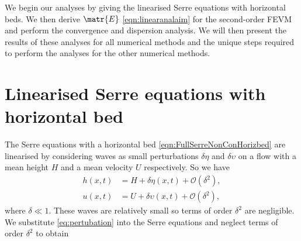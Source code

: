  We begin our analyses by giving the linearised Serre equations with horizontal beds. We then derive $\matr{E}$ \eqref{eqn:linearanalaim} for the second-order FEVM and perform the convergence and dispersion analysis. We will then present the results of these analyses for all numerical methods and the unique steps required to perform the analyses for the other numerical methods.
 

 
\section{Linearised Serre equations with horizontal bed}
The Serre equations with a horizontal bed \eqref{eqn:FullSerreNonConHorizbed} are linearised by considering waves as small perturbations $\delta\eta$ and $\delta\upsilon$ on a flow with a mean height $H$ and a mean velocity $U$ respectively. So we have
\begin{subequations}
	\label{eq:pertubation}
\begin{align}
h(x,t) &= H + \delta \eta(x,t) + \mathcal{O}\left(\delta^2 \right), \\
u(x,t) &= U + \delta \upsilon(x,t) + \mathcal{O}\left(\delta^2 \right),
\end{align}
\end{subequations}
where $\delta \ll 1$. These waves are relatively small so terms of order $\delta^2$ are negligible. We substitute \eqref{eq:pertubation} into the Serre equations and neglect terms of order $\delta^2$ to obtain

